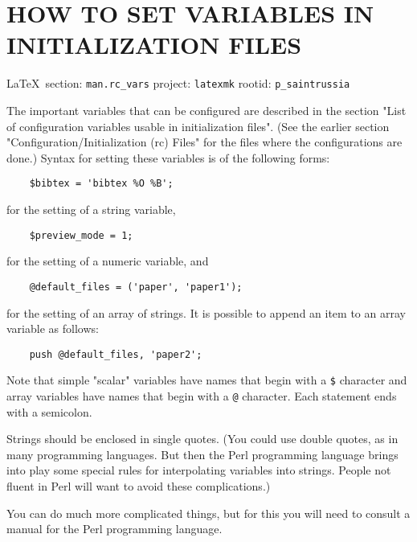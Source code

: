  
 

\section{HOW TO SET VARIABLES IN INITIALIZATION FILES}
  
\vspace{0.5cm}
 {\ifDEBUG\small\LaTeX~section: \verb|man.rc_vars| project: \verb|latexmk| rootid: \verb|p_saintrussia| \fi}
\vspace{0.5cm}
  
The important variables that can be configured  are  described  in  the section
"List  of  configuration  variables  usable  in initialization files".  (See
the earlier  section  "Configuration/Initialization  (rc) Files"  for  the
files where the configurations are done.)  Syntax for setting these variables
is of the following forms:

\begin{verbatim}
	$bibtex = 'bibtex %O %B';
\end{verbatim}

for the setting of a string variable,

\begin{verbatim}
	$preview_mode = 1;
\end{verbatim}

for the setting of a numeric variable, and

\begin{verbatim}
	@default_files = ('paper', 'paper1');
\end{verbatim}

for the setting of an array of strings.  It is possible  to  append  an item to
an array variable as follows:

\begin{verbatim}
	push @default_files, 'paper2';
\end{verbatim}

Note  that  simple  "scalar"  variables  have names that begin with a \verb|$|
character and array variables have names that begin with a \verb|@| character.
Each statement ends with a semicolon.

Strings  should  be  enclosed  in single quotes.  (You could use double quotes,
as in many programming languages.  But then the  Perl  programming  language
brings  into  play some special rules for interpolating variables into strings.
People not fluent in Perl will want  to  avoid these complications.)

You  can do much more complicated things, but for this you will need to consult
a manual for the Perl programming language.

